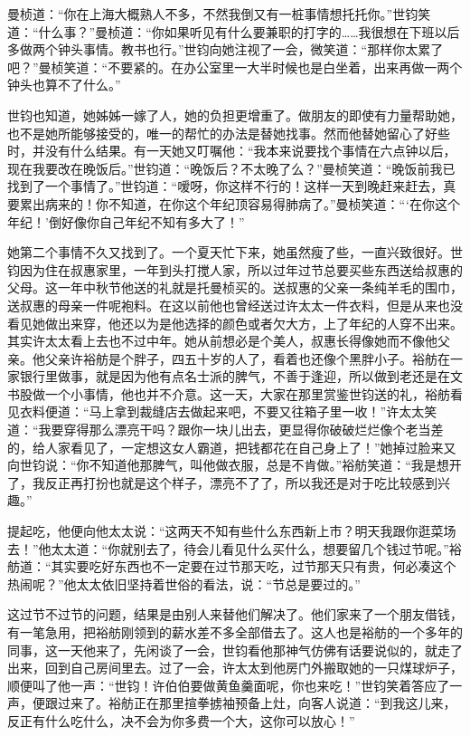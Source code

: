 \par 曼桢道：“你在上海大概熟人不多，不然我倒又有一桩事情想托托你。”世钧笑道：“什么事？”曼桢道：“你如果听见有什么要兼职的打字的……我很想在下班以后多做两个钟头事情。教书也行。”世钧向她注视了一会，微笑道：“那样你太累了吧？”曼桢笑道：“不要紧的。在办公室里一大半时候也是白坐着，出来再做一两个钟头也算不了什么。”
\par 世钧也知道，她姊姊一嫁了人，她的负担更增重了。做朋友的即使有力量帮助她，也不是她所能够接受的，唯一的帮忙的办法是替她找事。然而他替她留心了好些时，并没有什么结果。有一天她又叮嘱他：“我本来说要找个事情在六点钟以后，现在我要改在晚饭后。”世钧道：“晚饭后？不太晚了么？”曼桢笑道：“晚饭前我已找到了一个事情了。”世钧道：“嗳呀，你这样不行的！这样一天到晚赶来赶去，真要累出病来的！你不知道，在你这个年纪顶容易得肺病了。”曼桢笑道：“‘在你这个年纪！’倒好像你自己年纪不知有多大了！”
\par 她第二个事情不久又找到了。一个夏天忙下来，她虽然瘦了些，一直兴致很好。世钧因为住在叔惠家里，一年到头打搅人家，所以过年过节总要买些东西送给叔惠的父母。这一年中秋节他送的礼就是托曼桢买的。送叔惠的父亲一条纯羊毛的围巾，送叔惠的母亲一件呢袍料。在这以前他也曾经送过许太太一件衣料，但是从来也没看见她做出来穿，他还以为是他选择的颜色或者欠大方，上了年纪的人穿不出来。其实许太太看上去也不过中年。她从前想必是个美人，叔惠长得像她而不像他父亲。他父亲许裕舫是个胖子，四五十岁的人了，看着也还像个黑胖小子。裕舫在一家银行里做事，就是因为他有点名士派的脾气，不善于逢迎，所以做到老还是在文书股做一个小事情，他也并不介意。这一天，大家在那里赏鉴世钧送的礼，裕舫看见衣料便道：“马上拿到裁缝店去做起来吧，不要又往箱子里一收！”许太太笑道：“我要穿得那么漂亮干吗？跟你一块儿出去，更显得你破破烂烂像个老当差的，给人家看见了，一定想这女人霸道，把钱都花在自己身上了！”她掉过脸来又向世钧说：“你不知道他那脾气，叫他做衣服，总是不肯做。”裕舫笑道：“我是想开了，我反正再打扮也就是这个样子，漂亮不了了，所以我还是对于吃比较感到兴趣。”
\par 提起吃，他便向他太太说：“这两天不知有些什么东西新上市？明天我跟你逛菜场去！”他太太道：“你就别去了，待会儿看见什么买什么，想要留几个钱过节呢。”裕舫道：“其实要吃好东西也不一定要在过节那天吃，过节那天只有贵，何必凑这个热闹呢？”他太太依旧坚持着世俗的看法，说：“节总是要过的。”
\par 这过节不过节的问题，结果是由别人来替他们解决了。他们家来了一个朋友借钱，有一笔急用，把裕舫刚领到的薪水差不多全部借去了。这人也是裕舫的一个多年的同事，这一天他来了，先闲谈了一会，世钧看他那神气仿佛有话要说似的，就走了出来，回到自己房间里去。过了一会，许太太到他房门外搬取她的一只煤球炉子，顺便叫了他一声：“世钧！许伯伯要做黄鱼羹面呢，你也来吃！”世钧笑着答应了一声，便跟过来了。裕舫正在那里揎拳掳袖预备上灶，向客人说道：“到我这儿来，反正有什么吃什么，决不会为你多费一个大，这你可以放心！”
